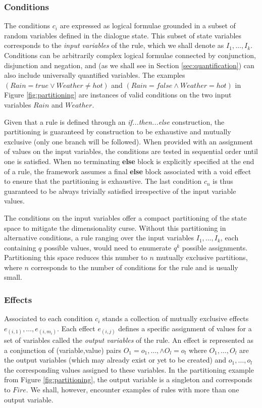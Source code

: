 \subsubsection*{Conditions}

The conditions $c_i$ are expressed as logical formulae grounded in a subset of random variables defined in the dialogue state. This subset of state variables corresponds to the \textit{input variables} of the rule, which we shall denote as $I_1, \dots, I_{k}$. Conditions can be arbitrarily complex logical formulae connected by conjunction, disjunction and negation, and (as we shall see in Section \ref{sec:quantification}) can also include universally quantified variables. The examples $(\mathit{Rain}\!=\mathit{true} \lor \mathit{Weather}\!\neq\mathit{hot})$ and $(\mathit{Rain}\!=\mathit{false} \land \mathit{Weather}\!=\mathit{hot})$ in Figure \ref{fig:partitioning} are instances of valid conditions on the two input variables $Rain$ and $\mathit{Weather}$. 

Given that a rule is defined through an \textit{if...then...else} construction, the partitioning is guaranteed by construction to be exhaustive and mutually exclusive (only one branch will be followed).  When provided with an assignment of values on the input variables, the conditions are tested in sequential order until one is satisfied. When no terminating \textbf{else} block is explicitly specified at the end of a rule, the framework assumes a final \textbf{else} block associated with a void effect to ensure that the partitioning is exhaustive. The last condition $c_n$ is thus guaranteed to be always trivially satisfied irrespective of the input variable values. 

The conditions on the input variables offer a compact partitioning of the state space to mitigate the dimensionality curse.  Without this partitioning in alternative conditions, a rule ranging over the input variables $I_1, \dots, I_{k}$, each containing $q$ possible values,  would need to enumerate $q^{k}$ possible assignments.  Partitioning this space reduces this number to $n$ mutually exclusive partitions, where $n$ corresponds to the number of conditions for the rule and is usually small. 


\subsubsection*{Effects}

Associated to each condition $c_i$ stands a collection of mutually exclusive effects $e_{(i,1)}, \dots, e_{(i,m_i)}$. Each effect $e_{(i,j)}$ defines a specific assignment of values for a set of variables called the \textit{output variables} of the rule.  An effect is represented as a conjunction of (variable,value) pairs $O_1\!=\!o_1, \dots, \land O_{l}\!=\!o_{l}$ where $O_1, \dots, O_{l}$ are the output variables (which may already exist or yet to be created) and $o_1, \dots, o_{l}$ the corresponding values assigned to these variables. In the partitioning example from Figure \ref{fig:partitioning}, the output variable is a singleton and corresponds to $Fire$. We shall, however, encounter examples of rules with more than one output variable. 

